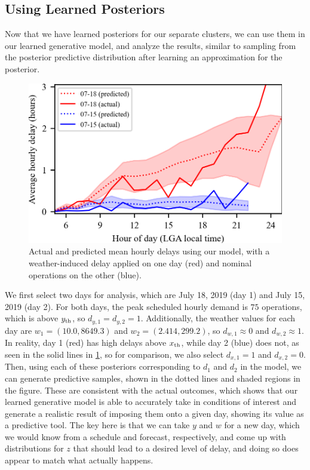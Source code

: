 \subsection{Using Learned Posteriors}

Now that we have learned posteriors for our separate clusters, we can use them in our learned generative model, and analyze the results, similar to sampling from the posterior predictive distribution after learning an approximation for the posterior. 

\begin{figure}[htb!]
    \centering
    \includegraphics[width=0.7\linewidth]{media/posterior_predictive_comparison.png}
    \caption{Actual and predicted mean hourly delays using our model, with a weather-induced delay applied on one day (red) and nominal operations on the other (blue).}
    \label{fig:pp-comparison}
\end{figure}

We first select two days for analysis, which are July 18, 2019 (day 1) and July 15, 2019 (day 2). For both days, the peak scheduled hourly demand is $75$ operations, which is above $y_{\mathrm{th}}$, so $d_{y,1}=d_{y,2}=1$. Additionally, the weather values for each day are $w_1=(10.0, 8649.3)$ and $w_2=(2.414,299.2)$, so $d_{w,1}\approx 0$ and $d_{w,2}\approx 1$. In reality, day 1 (red) has high delays above $x_{\mathrm{th}}$, while day 2 (blue) does not, as seen in the solid lines in \cref{fig:pp-comparison}, so for comparison, we also select $d_{x,1}=1$ and $d_{x,2}=0$. Then, using each of these posteriors corresponding to $d_1$ and $d_2$ in the model, we can generate predictive samples, shown in the dotted lines and shaded regions in the figure. These are consistent with the actual outcomes, which shows that our learned generative model is able to accurately take in conditions of interest and generate a realistic result of imposing them onto a given day, showing its value as a predictive tool. The key here is that we can take $y$ and $w$ for a new day, which we would know from a schedule and forecast, respectively, and come up with distributions for $z$ that should lead to a desired level of delay, and doing so does appear to match what actually happens.

